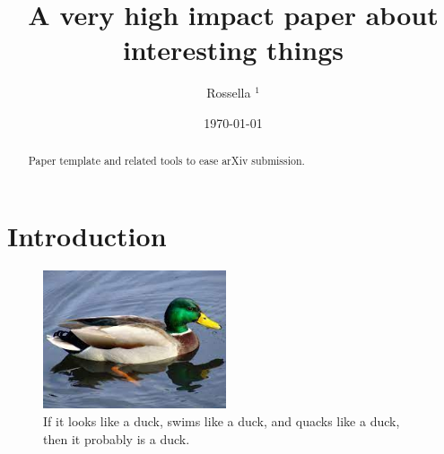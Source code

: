 \documentclass[prd,amssymb,amsmath,amsfonts,nofootinbib,reprint,showpacs, longbibliography]{revtex4-1}
\begin{document}
\title{A very high impact paper about interesting things}
\author{Rossella ${}^{1}$}


\begin{abstract}
Paper template and related tools to ease arXiv submission.
\end{abstract}
\date{\today}
\maketitle

\section{Introduction}

\lipsum[1] \cite{2021arXiv210316737M}


\begin{figure}[t]
  \label{fig:duck}
    \includegraphics[width=0.48\textwidth]{./figs/duck.png}
 	\caption{If it looks like a duck, swims like a duck, and quacks like a duck, then it probably is a duck.}
\end{figure}


\end{document}

